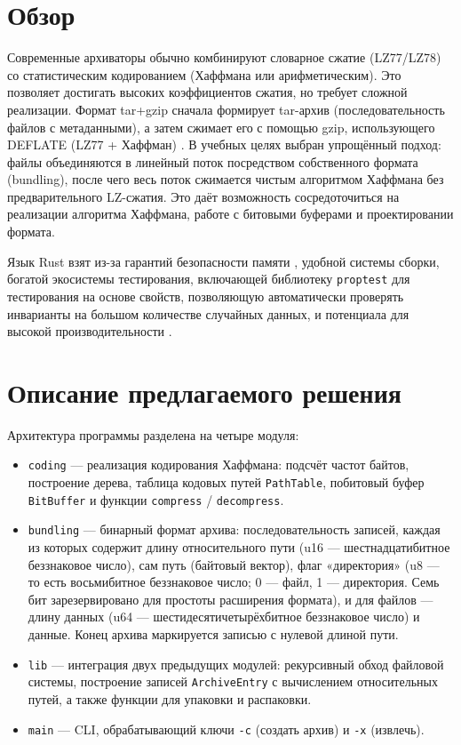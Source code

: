 \documentclass[a4paper]{article}
\begin{document}
\section{Обзор}

Современные архиваторы обычно комбинируют словарное сжатие (LZ77/LZ78) со статистическим кодированием (Хаффмана или арифметическим). Это позволяет достигать высоких коэффициентов сжатия, но требует сложной реализации. Формат tar+gzip сначала формирует tar-архив (последовательность файлов с метаданными), а затем сжимает его с помощью gzip, использующего DEFLATE (LZ77 + Хаффман) \cite{gzip}\cite{deflate}. В учебных целях выбран упрощённый подход: файлы объединяются в линейный поток посредством собственного формата (bundling), после чего весь поток сжимается чистым алгоритмом Хаффмана без предварительного LZ-сжатия. Это даёт возможность сосредоточиться на реализации алгоритма Хаффмана, работе с битовыми буферами и проектировании формата.

Язык Rust взят из-за гарантий безопасности памяти \cite{rust_in_android}, удобной системы сборки, богатой экосистемы тестирования, включающей библиотеку \texttt{proptest} для тестирования на основе свойств, позволяющую автоматически проверять инварианты на большом количестве случайных данных, и потенциала для высокой производительности \cite{nsf}.

\section{Описание предлагаемого решения}

Архитектура программы разделена на четыре модуля:

\begin{itemize}
    \item \texttt{coding} --- реализация кодирования Хаффмана: подсчёт частот байтов, построение дерева, таблица кодовых путей \texttt{PathTable}, побитовый буфер \texttt{BitBuffer} и функции \texttt{compress} / \texttt{decompress}.
    \item \texttt{bundling} --- бинарный формат архива: последовательность записей, каждая из которых содержит длину относительного пути (u16 — шестнадцатибитное беззнаковое число), сам путь (байтовый вектор), флаг «директория» (u8 — то есть восьмибитное беззнаковое число; 0 — файл, 1 — директория. Семь бит зарезервировано для простоты расширения формата), и для файлов — длину данных (u64 — шестидесятичетырёхбитное беззнаковое число) и данные. Конец архива маркируется записью с нулевой длиной пути.
    \item \texttt{lib} --- интеграция двух предыдущих модулей: рекурсивный обход файловой системы, построение записей \texttt{ArchiveEntry} с вычислением относительных путей, а также функции для упаковки и распаковки.
    \item \texttt{main} --- CLI, обрабатывающий ключи \texttt{-c} (создать архив) и \texttt{-x} (извлечь).
\end{itemize}
\end{document}

